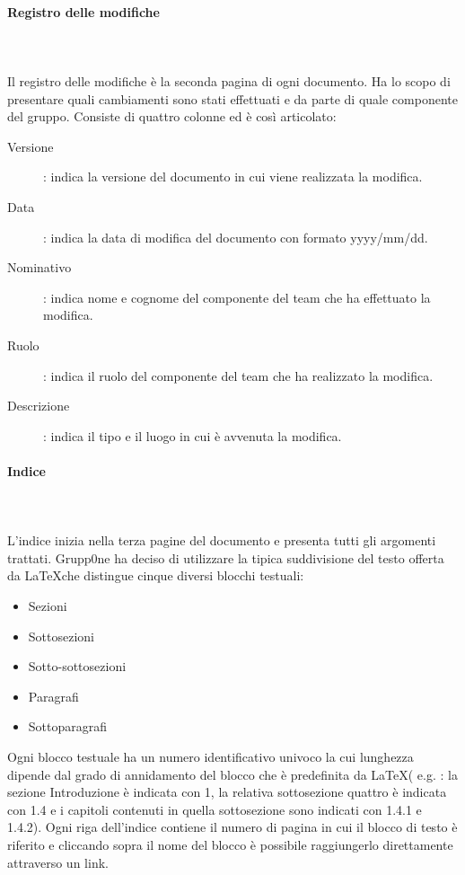 \documentclass[../norme-di-progetto.tex]{subfiles}
\begin{document}
\paragraph{Registro delle modifiche}\mbox{}\\
\label{par:registro delle modifiche}
\\Il registro delle modifiche è la seconda pagina di ogni documento. Ha lo scopo di presentare quali cambiamenti sono stati effettuati e da parte di quale componente del gruppo. Consiste di quattro colonne ed è così articolato:
\begin{description}
	\item [Versione]: indica la versione del documento in cui viene realizzata la modifica.
	\item [Data]: indica la data di modifica del documento con formato yyyy/mm/dd.
	\item [Nominativo]: indica nome e cognome del componente del team che ha effettuato la modifica.
	\item [Ruolo]: indica il ruolo del componente del team che ha realizzato la modifica.
	\item [Descrizione]: indica il tipo e il luogo in cui è avvenuta la modifica.
\end{description}
\paragraph{Indice}\mbox{}\\
\label{par:indice}
\\L'indice inizia nella terza pagine del documento e presenta tutti gli argomenti trattati. Grupp0ne ha deciso di utilizzare la tipica suddivisione del testo offerta da \LaTeX che distingue cinque diversi blocchi testuali:
\begin{itemize}
	\item Sezioni
	\item Sottosezioni
	\item Sotto-sottosezioni
	\item Paragrafi
	\item Sottoparagrafi 
\end{itemize}
Ogni blocco testuale ha un numero identificativo univoco la cui lunghezza dipende dal grado di annidamento del blocco che è predefinita da \LaTeX ( e.g. : la sezione Introduzione è indicata con 1, la relativa sottosezione quattro è indicata con 1.4 e i capitoli contenuti in quella sottosezione sono indicati con 1.4.1 e 1.4.2).
\newline Ogni riga dell'indice contiene il numero di pagina in cui il blocco di testo è riferito e cliccando sopra il nome del blocco è possibile raggiungerlo direttamente attraverso un link.
\end{document}
